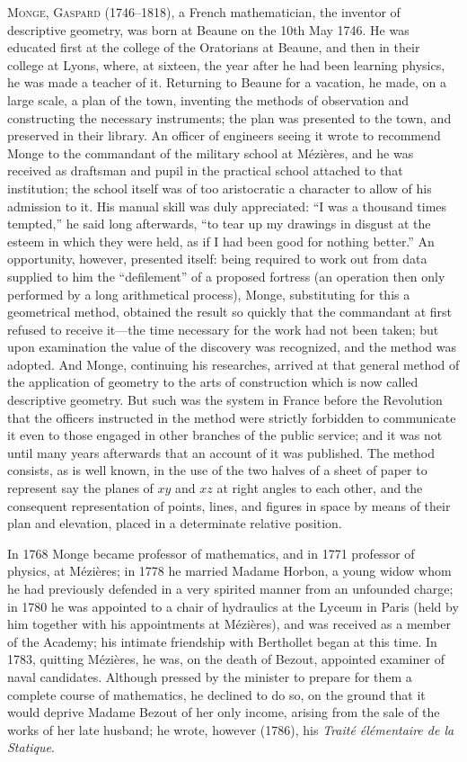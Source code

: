 \documentclass[11pt,a4paper]{article}
\theoremstyle{definition}
\begin{document}
\textsc{Monge, Gaspard} (1746--1818), a French mathematician, the inventor of descriptive geometry, was born at Beaune on the 10th May 1746. He was educated first at the college of the Oratorians at Beaune, and then in their college at Lyons, where, at sixteen, the year after he had been learning physics, he was made a teacher of it. Returning to Beaune for a vacation, he made, on a large scale, a plan of the town, inventing the methods of observation and constructing the necessary instruments; the plan was presented to the town, and preserved in their library. An officer of engineers seeing it wrote to recommend Monge to the commandant of the military school at M\'ezi\`eres, and he was received as draftsman and pupil in the practical school attached to that institution; the school itself was of too aristocratic a character to allow of his admission to it. His manual skill was duly appreciated: ``I was a thousand times tempted,'' he said long afterwards, ``to tear up my drawings in disgust at the esteem in which they were held, as if I had been good for nothing better.'' An opportunity, however, presented itself: being required to work out from data supplied to him the ``defilement'' of a proposed fortress (an operation then only performed by a long arithmetical process), Monge, substituting for this a geometrical method, obtained the result so quickly that the commandant at first refused to receive it---the time necessary for the work had not been taken; but upon examination the value of the discovery was recognized, and the method was adopted. And Monge, continuing his researches, arrived at that general method of the application of geometry to the arts of construction which is now called descriptive geometry. But such was the system in France before the Revolution that the officers instructed in the method were strictly forbidden to communicate it even to those engaged in other branches of the public service; and it was not until many years afterwards that an account of it was published. The method consists, as is well known, in the use of the two halves of a sheet of paper to represent say the planes of $xy$ and $xz$ at right angles to each other, and the consequent representation of points, lines, and figures in space by means of their plan and elevation, placed in a determinate relative position.

In 1768 Monge became professor of mathematics, and in 1771 professor of physics, at M\'ezi\`eres; in 1778 he married Madame Horbon, a young widow whom he had previously defended in a very spirited manner from an unfounded charge; in 1780 he was appointed to a chair of hydraulics at the Lyceum in Paris (held by him together with his appointments at M\'ezi\`eres), and was received as a member of the Academy; his intimate friendship with Berthollet began at this time. In 1783, quitting M\'ezi\`eres, he was, on the death of Bezout, appointed examiner of naval candidates. Although pressed by the minister to prepare for them a complete course of mathematics, he declined to do so, on the ground that it would deprive Madame Bezout of her only income, arising from the sale of the works of her late husband; he wrote, however (1786), his \textit{Trait\'e \'el\'ementaire de la Statique}.
\end{document}
